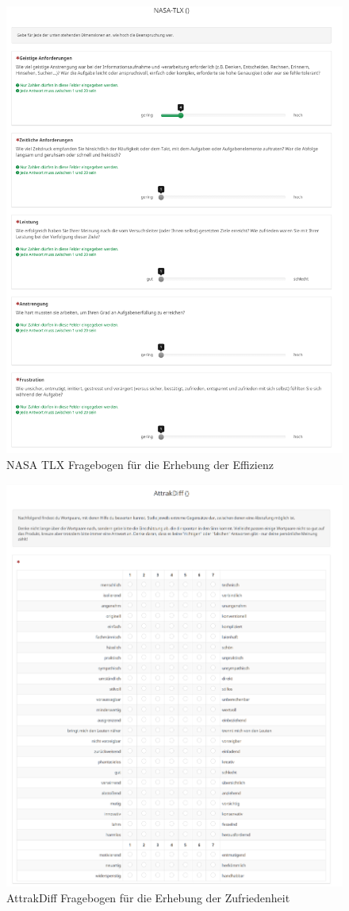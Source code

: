 \begin{figure}[H]
    \includegraphics[width=\textwidth]{images/Frageboegen/3 NASA-TLX.PNG}
    \centering
    \caption{NASA TLX Fragebogen für die Erhebung der Effizienz}
    \label{fig:tlx}
\end{figure}

\begin{figure}[H]
    \includegraphics[width=\textwidth]{images/Frageboegen/4 ADiff.PNG}
    \centering
    \caption{AttrakDiff Fragebogen für die Erhebung der Zufriedenheit}
    \label{fig:adiff}
\end{figure}
